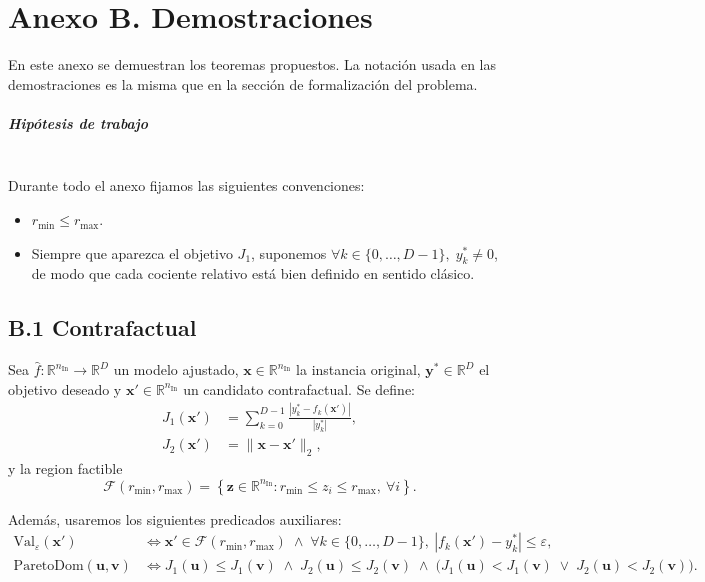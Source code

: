 \documentclass[12pt]{report} %
\begin{document}
\chapter* {Anexo B. Demostraciones}

En este anexo se demuestran los teoremas propuestos. La notación usada en las demostraciones es la misma que en la sección de formalización del problema.

\paragraph*{Hipótesis de trabajo}\mbox{}\\
Durante todo el anexo fijamos las siguientes convenciones:
\begin{itemize}
    \item $r_{\min} \leq r_{\max}$.
    \item Siempre que aparezca el objetivo $J_1$, suponemos $\forall k \in \{0, \ldots, D-1\},\; y_k^* \neq 0$, de modo que cada cociente relativo está bien definido en sentido clásico.
\end{itemize}

\section*{B.1 Contrafactual}

Sea $\hat{f}: \mathbb{R}^{n_{\text{In}}} \to \mathbb{R}^{D}$ un modelo ajustado,
$\mathbf{x} \in \mathbb{R}^{n_{\text{In}}}$ la instancia original,
$\mathbf{y}^{*} \in \mathbb{R}^{D}$ el objetivo deseado y
$\mathbf{x}' \in \mathbb{R}^{n_{\text{In}}}$ un candidato contrafactual.
Se define:
\begin{align*}
    J_1(\mathbf{x}') & = \sum_{k=0}^{D-1} \frac{|y_k^{*} - f_k(\mathbf{x}')|}{|y_k^{*}|}, \\
    J_2(\mathbf{x}') & = \|\mathbf{x} - \mathbf{x}'\|_2,
\end{align*}
y la region factible
$$
    \mathcal{F}(r_{\min}, r_{\max})=
    \left\{\mathbf{z}\in\mathbb{R}^{n_{\text{In}}}: r_{\min}\le z_i\le r_{\max},\ \forall i\right\}.
$$

Además, usaremos los siguientes predicados auxiliares:
\begin{align*}
    \mathrm{Val}_{\varepsilon}(\mathbf{x}')
     & \Longleftrightarrow \mathbf{x}' \in \mathcal{F}(r_{\min}, r_{\max})
    \;\wedge\; \forall k \in \{0, \ldots, D-1\},\ \left|f_k(\mathbf{x}') - y_k^*\right| \le \varepsilon, \\
    \mathrm{ParetoDom}(\mathbf{u}, \mathbf{v})
     & \Longleftrightarrow J_1(\mathbf{u}) \le J_1(\mathbf{v})
    \;\wedge\; J_2(\mathbf{u}) \le J_2(\mathbf{v})
    \;\wedge\; \bigl(J_1(\mathbf{u}) < J_1(\mathbf{v}) \;\vee\; J_2(\mathbf{u}) < J_2(\mathbf{v})\bigr).
\end{align*}
\end{document}
